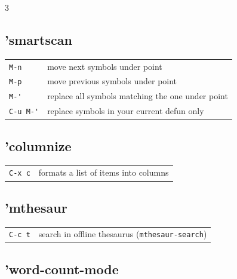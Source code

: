 \documentclass[11pt,landscape,a4paper]{article}
\begin{document}
\begin{multicols}{3}
\subsection{'smartscan} %


\begin{tabular}{@{}ll@{}}
	{\color{cgreen}\verb|M-n|} 		& move next symbols under point\\
	{\color{cgreen}\verb|M-p|} 		& move previous symbols under point\\
	{\color{cgreen}\verb|M-'|} 		& replace all symbols matching the one under point\\ %
	{\color{cgreen}\verb|C-u M-'|} 		& replace symbols in your current defun only\\
	
\end{tabular}

%
%


\subsection{'columnize}


\begin{tabular}{@{}ll@{}}
	{\color{cgreen}\verb|C-x c|} 		& formats a list of items into columns\\
\end{tabular}

\subsection{'mthesaur}

\begin{tabular}{@{}ll@{}}
	{\color{cgreen}\verb|C-c t|} 			& search in offline thesaurus (\verb|mthesaur-search|)\\ 
\end{tabular}


\subsection{'word-count-mode}


\end{multicols}
\end{document}
